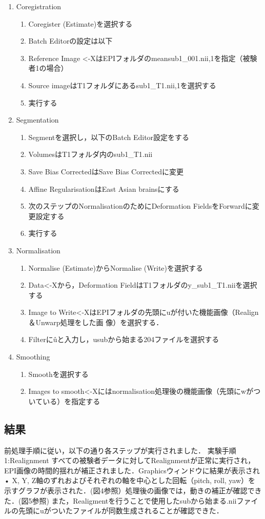 \documentclass{jlreq}
\begin{document}
\begin{enumerate}
    \item Coregistration
    \begin{enumerate}
        \item Coregister (Estimate)を選択する
        \item Batch Editorの設定は以下
        \item Reference Image <-XはEPIフォルダのmeansub1\_001.nii,1を指定（被験者1の場合）
        \item Source imageはT1フォルダにあるsub1\_T1.nii,1を選択する
        \item 実行する
    \end{enumerate}
    \item Segmentation
    \begin{enumerate}
        \item Segmentを選択し，以下のBatch Editor設定をする
        \item VolumesはT1フォルダ内のsub1\_T1.nii
        \item Save Bias CorrectedはSave Bias Correctedに変更
        \item Affine RegularisationはEast Asian brainsにする
        \item 次のステップのNormalisationのためにDeformation FieldsをForwardに変更設定する
        \item 実行する
    \end{enumerate}
    \item Normalisation
    \begin{enumerate}
        \item Normalise (Estimate)からNormalise (Write)を選択する
        \item Data<-Xから，Deformation FieldはT1フォルダのy\_sub1\_T1.niiを選択する
        \item Image to Write<-XはEPIフォルダの先頭にuが付いた機能画像（Realign＆Unwarp処理をした画
        像）を選択する．
        \item Filterに\^uと入力し，usubから始まる204ファイルを選択する
        \end{enumerate}
    \item Smoothing
    \begin{enumerate}
        \item Smoothを選択する
        \item Images to smooth<-Xにはnormalisation処理後の機能画像（先頭にwがついている）を指定する 
    \end{enumerate}
\end{enumerate}
\subsection{結果}
前処理手順に従い，以下の通り各ステップが実行されました．
実験手順1:Realignment
すべての被験者データに対してRealignmentが正常に実行され，EPI画像の時間的揺れが補正されました．Graphicsウィンドウに結果が表示され• X, Y, Z軸のずれおよびそれぞれの軸を中心とした回転（pitch, roll, yaw）を示すグラフが表示された．(図4参照）処理後の画像では，動きの補正が確認できた．(図5参照)
また，Realigmentを行うことで使用したsubから始まる.niiファイルの先頭にuがついたファイルが同数生成されることが確認できた．
\end{document}
